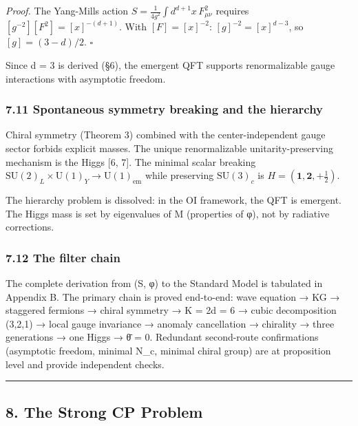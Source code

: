 \documentclass[
  11pt,
]{article}
\begin{document}
\emph{Proof.} The Yang-Mills action
\(S = \frac{1}{4g^2}\int d^{d+1}x\,F_{\mu\nu}^2\) requires
\([g^{-2}][F^2] = [x]^{-(d+1)}\). With \([F] = [x]^{-2}\):
\([g]^{-2} = [x]^{d-3}\), so \([g] = (3-d)/2\). \(\square\)

Since d = 3 is derived (§6), the emergent QFT supports renormalizable
gauge interactions with asymptotic freedom.

\hypertarget{spontaneous-symmetry-breaking-and-the-hierarchy}{%
\subsubsection{7.11 Spontaneous symmetry breaking and the
hierarchy}\label{spontaneous-symmetry-breaking-and-the-hierarchy}}

Chiral symmetry (Theorem 3) combined with the center-independent gauge
sector forbids explicit masses. The unique renormalizable
unitarity-preserving mechanism is the Higgs {[}6, 7{]}. The minimal
scalar breaking
\(\mathrm{SU}(2)_L \times \mathrm{U}(1)_Y \to \mathrm{U}(1)_{\text{em}}\)
while preserving \(\mathrm{SU}(3)_c\) is
\(H = (\mathbf{1}, \mathbf{2}, +\tfrac{1}{2})\).

The hierarchy problem is dissolved: in the OI framework, the QFT is
emergent. The Higgs mass is set by eigenvalues of M (properties of φ),
not by radiative corrections.

\hypertarget{the-filter-chain}{%
\subsubsection{7.12 The filter chain}\label{the-filter-chain}}

The complete derivation from (S, φ) to the Standard Model is tabulated
in Appendix B. The primary chain is proved end-to-end: wave equation →
KG → staggered fermions → chiral symmetry → K = 2d = 6 → cubic
decomposition (3,2,1) → local gauge invariance → anomaly cancellation →
chirality → three generations → one Higgs → θ̄ = 0. Redundant
second-route confirmations (asymptotic freedom, minimal N\_c, minimal
chiral group) are at proposition level and provide independent checks.

\begin{center}\rule{0.5\linewidth}{0.5pt}\end{center}

\hypertarget{the-strong-cp-problem}{%
\subsection{8. The Strong CP Problem}\label{the-strong-cp-problem}}
\end{document}
